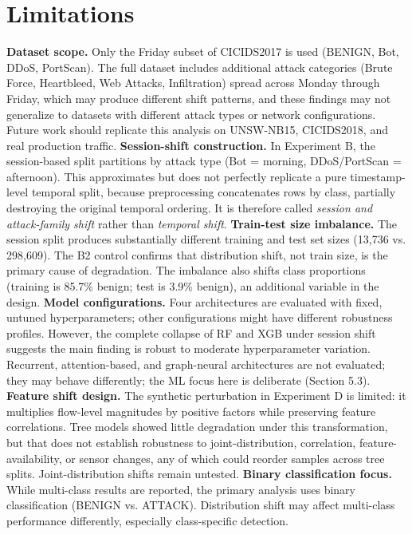 \documentclass[10pt]{article}
\begin{document}
\section{Limitations}
\textbf{Dataset scope.} Only the Friday subset of CICIDS2017 is used (BENIGN, Bot, DDoS, PortScan). The full dataset includes additional attack categories (Brute Force, Heartbleed, Web Attacks, Infiltration) spread across Monday through Friday, which may produce different shift patterns, and these findings may not generalize to datasets with different attack types or network configurations. Future work should replicate this analysis on UNSW-NB15, CICIDS2018, and real production traffic.
\textbf{Session-shift construction.} In Experiment B, the session-based split partitions by attack type (Bot = morning, DDoS/PortScan = afternoon). This approximates but does not perfectly replicate a pure timestamp-level temporal split, because preprocessing concatenates rows by class, partially destroying the original temporal ordering. It is therefore called \textit{session and attack-family shift} rather than \textit{temporal shift}.
\textbf{Train-test size imbalance.} The session split produces substantially different training and test set sizes (13,736 vs. 298,609). The B2 control confirms that distribution shift, not train size, is the primary cause of degradation. The imbalance also shifts class proportions (training is 85.7\% benign; test is 3.9\% benign), an additional variable in the design.
\textbf{Model configurations.} Four architectures are evaluated with fixed, untuned hyperparameters; other configurations might have different robustness profiles. However, the complete collapse of RF and XGB under session shift suggests the main finding is robust to moderate hyperparameter variation. Recurrent, attention-based, and graph-neural architectures are not evaluated; they may behave differently; the ML focus here is deliberate (Section 5.3).
\textbf{Feature shift design.} The synthetic perturbation in Experiment D is limited: it multiplies flow-level magnitudes by positive factors while preserving feature correlations. Tree models showed little degradation under this transformation, but that does not establish robustness to joint-distribution, correlation, feature-availability, or sensor changes, any of which could reorder samples across tree splits. Joint-distribution shifts remain untested.
\textbf{Binary classification focus.} While multi-class results are reported, the primary analysis uses binary classification (BENIGN vs. ATTACK). Distribution shift may affect multi-class performance differently, especially class-specific detection.
\end{document}
